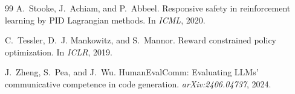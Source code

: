 \documentclass[11pt]{article}
\begin{document}
\begin{thebibliography}{99}
A.~Stooke, J.~Achiam, and P.~Abbeel. Responsive safety in reinforcement learning by {PID} {L}agrangian methods. In \emph{ICML}, 2020.

C.~Tessler, D.~J. Mankowitz, and S.~Mannor. Reward constrained policy optimization. In \emph{ICLR}, 2019.

J.~Zheng, S.~Pea, and J.~Wu. {HumanEvalComm}: Evaluating {LLMs}' communicative competence in code generation. \emph{arXiv:2406.04737}, 2024.

\end{thebibliography}
\end{document}
